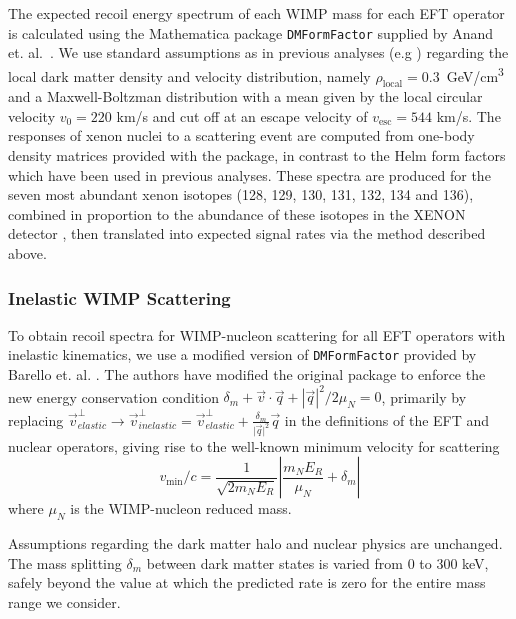 The expected recoil energy spectrum of each WIMP mass for each EFT operator is calculated using the Mathematica package \texttt{DMFormFactor} supplied by Anand et. al.~\cite{Fitzpatrick:MathTools,Anand:MathTools}. We use standard assumptions as in previous analyses (e.g \cite{xe100_run_combination}) regarding the local dark matter density and velocity distribution, namely $\rho_\mathrm{local} = 0.3$~GeV/cm\textsuperscript{3} and a Maxwell-Boltzman distribution with a mean given by the local circular velocity $v_0 = 220$ km/s and cut off at an escape velocity of $v_\mathrm{esc} = 544$ km/s. The responses of xenon nuclei to a scattering event are computed from one-body density matrices provided with the package, in contrast to the Helm form factors which have been used in previous analyses. These spectra are produced for the seven most abundant xenon isotopes (128, 129, 130, 131, 132, 134 and 136), combined in proportion to the abundance of these isotopes in the XENON detector \cite{xe100_run10_sd}, then translated into expected signal rates via the method described above.

\subsubsection{Inelastic WIMP Scattering}
\label{subsubsec:Inelastic}
To obtain recoil spectra for WIMP-nucleon scattering for all EFT operators with inelastic kinematics, we use a modified version of \texttt{DMFormFactor} provided by Barello et. al. \cite{InelasticMath}. The authors have modified the original package to enforce the new energy conservation condition $\delta_m + \vec{v}\cdot\vec{q} + \left|\vec{q}\right|^2/2\mu_N = 0$, primarily by replacing 
$\vec{v}^\perp_{elastic} \rightarrow \vec{v}^\perp_{inelastic} = \vec{v}^\perp_{elastic} +\frac{\delta_m}{\vert{\vec{q}}\vert^2}\vec{q}$ in the definitions of the EFT and nuclear operators, giving rise to the well-known minimum velocity for scattering
\begin{equation}
  v_\mathrm{min}/c = \frac{1}{\sqrt{2 m_N E_R}} \left|\frac{m_N E_R}{\mu_N} + \delta_m\right|
\end{equation}
where $\mu_N$ is the WIMP-nucleon reduced mass.

Assumptions regarding the dark matter halo and nuclear physics are unchanged. The mass splitting $\delta_m$ between dark matter states is varied from 0 to 300 keV, safely beyond the value at which the predicted rate is zero for the entire mass range we consider.
